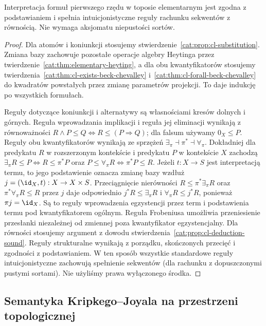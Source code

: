 \begin{stwierdzenie}\label{cat:prop:cl-internal-soundness}
Interpretacja formuł pierwszego rzędu w toposie elementarnym jest zgodna z podstawianiem i spełnia intuicjonistyczne reguły rachunku sekwentów z równością. Nie wymaga aksjomatu niepustości sortów.
\end{stwierdzenie}
\begin{proof}
Dla atomów i koniunkcji stosujemy stwierdzenie~\ref{cat:prop:cl-substitution}. Zmiana bazy zachowuje pozostałe operacje algebry Heytinga przez twierdzenie~\ref{cat:thm:elementary-heyting}, a dla obu kwantyfikatorów stosujemy twierdzenia~\ref{cat:thm:cl-exists-beck-chevalley} i~\ref{cat:thm:cl-forall-beck-chevalley} do kwadratów powstałych przez zmianę parametrów projekcji. To daje indukcję po wszystkich formułach.

Reguły dotyczące koniunkcji i alternatywy są własnościami kresów dolnych i górnych. Reguła wprowadzania implikacji i reguła jej eliminacji wynikają z równoważności $R\wedge P\leq Q\iff R\leq(P\Rightarrow Q)$; dla falsum używamy $0_X\leq P$. Reguły obu kwantyfikatorów wynikają ze sprzężeń $\exists_\pi\dashv\pi^*\dashv\forall_\pi$. Dokładniej dla predykatu $R$ w rozszerzonym kontekście i predykatu $P$ w kontekście $X$ zachodzą $\exists_\pi R\leq P\iff R\leq\pi^*P$ oraz $P\leq\forall_\pi R\iff\pi^*P\leq R$. Jeżeli $t:X\to S$ jest interpretacją termu, to jego podstawienie oznacza zmianę bazy wzdłuż $j=(\id_X,t):X\to X\times S$. Przeciągnięcie nierówności $R\leq\pi^*\exists_\pi R$ oraz $\pi^*\forall_\pi R\leq R$ przez $j$ daje odpowiednio $j^*R\leq\exists_\pi R$ i $\forall_\pi R\leq j^*R$, ponieważ $\pi j=\id_X$. Są to reguły wprowadzenia egzystencji przez term i podstawienia termu pod kwantyfikatorem ogólnym. Reguła Frobeniusa umożliwia przeniesienie przesłanki niezależnej od zmiennej poza kwantyfikator egzystencjalny. Dla równości stosujemy argument z dowodu stwierdzenia~\ref{cat:prop:cl-deduction-sound}. Reguły strukturalne wynikają z porządku, skończonych przecięć i zgodności z podstawianiem. W ten sposób wszystkie standardowe reguły intuicjonistyczne zachowują spełnienie sekwentów (dla rachunku z dopuszczonymi pustymi sortami). Nie użyliśmy prawa wyłączonego środka.
\end{proof}

\subsection{Semantyka Kripkego--Joyala na przestrzeni topologicznej}

